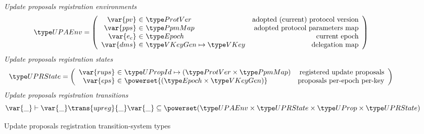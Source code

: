 \begin{figure}[htb]
  \emph{Update proposals registration  environments}
    \begin{equation*}
    \UPAEnv =
    \left(
      \begin{array}{r@{~\in~}lr}
        \var{pv} & \ProtVer & \text{adopted (current) protocol version}\\
        \var{pps} & \PPMMap & \text{adopted protocol parameters map}\\
        \var{e_c} & \Epoch & \text{current epoch}\\
        \var{dms} & \VKeyGen \mapsto \VKey & \text{delegation map}\\
      \end{array}
    \right)
  \end{equation*}
  \emph{Update proposals registration states}
  \begin{equation*}
    \UPRState
    = \left(
      \begin{array}{r@{~\in~}lr}
        \var{rups} & \UPropId \mapsto (\ProtVer \times \PPMMap)
        & \text{registered update proposals}\\
        \var{eps} & \powerset{(\Epoch \times \VKeyGen)} & \text{proposals per-epoch per-key}\\
      \end{array}
    \right)
  \end{equation*}
  \emph{Update proposals registration transitions}
  \begin{equation*}
    \var{\_} \vdash
    \var{\_} \trans{upreg}{\_} \var{\_}
    \subseteq \powerset (\UPAEnv \times \UPRState \times \UProp \times \UPRState)
  \end{equation*}
  \caption{Update proposals registration transition-system types}
  \label{fig:ts-types:up-registration}
\end{figure}

